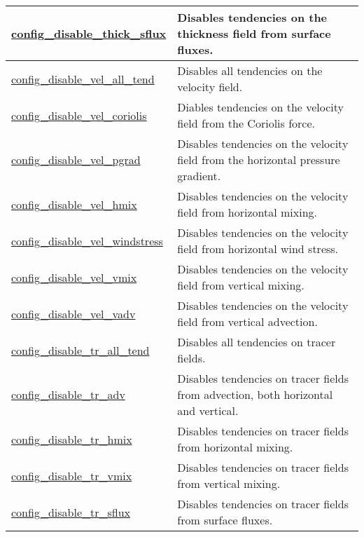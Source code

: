 {\begin{center}
\begin{longtable}{| p{2.0in} || p{4.0in} |}
	\hline
	\hyperref[sec:nm_sec_config_disable_thick_sflux]{config\_disable\_thick\_sflux} & Disables tendencies on the thickness field from surface fluxes. \\
	\hline
	\hyperref[sec:nm_sec_config_disable_vel_all_tend]{config\_disable\_vel\_all\_tend} & Disables all tendencies on the velocity field. \\
	\hline
	\hyperref[sec:nm_sec_config_disable_vel_coriolis]{config\_disable\_vel\_coriolis} & Diables tendencies on the velocity field from the Coriolis force. \\
	\hline
	\hyperref[sec:nm_sec_config_disable_vel_pgrad]{config\_disable\_vel\_pgrad} & Disables tendencies on the velocity field from the horizontal pressure gradient. \\
	\hline
	\hyperref[sec:nm_sec_config_disable_vel_hmix]{config\_disable\_vel\_hmix} & Disables tendencies on the velocity field from horizontal mixing. \\
	\hline
	\hyperref[sec:nm_sec_config_disable_vel_windstress]{config\_disable\_vel\_windstress} & Disables tendencies on the velocity field from horizontal wind stress. \\
	\hline
	\hyperref[sec:nm_sec_config_disable_vel_vmix]{config\_disable\_vel\_vmix} & Disables tendencies on the velocity field from vertical mixing. \\
	\hline
	\hyperref[sec:nm_sec_config_disable_vel_vadv]{config\_disable\_vel\_vadv} & Disables tendencies on the velocity field from vertical advection. \\
	\hline
	\hyperref[sec:nm_sec_config_disable_tr_all_tend]{config\_disable\_tr\_all\_tend} & Disables all tendencies on tracer fields. \\
	\hline
	\hyperref[sec:nm_sec_config_disable_tr_adv]{config\_disable\_tr\_adv} & Disables tendencies on tracer fields from advection, both horizontal and vertical. \\
	\hline
	\hyperref[sec:nm_sec_config_disable_tr_hmix]{config\_disable\_tr\_hmix} & Disables tendencies on tracer fields from horizontal mixing. \\
	\hline
	\hyperref[sec:nm_sec_config_disable_tr_vmix]{config\_disable\_tr\_vmix} & Disables tendencies on tracer fields from vertical mixing. \\
	\hline
	\hyperref[sec:nm_sec_config_disable_tr_sflux]{config\_disable\_tr\_sflux} & Disables tendencies on tracer fields from surface fluxes. \\
	\hline
\end{longtable}
\end{center}
}
